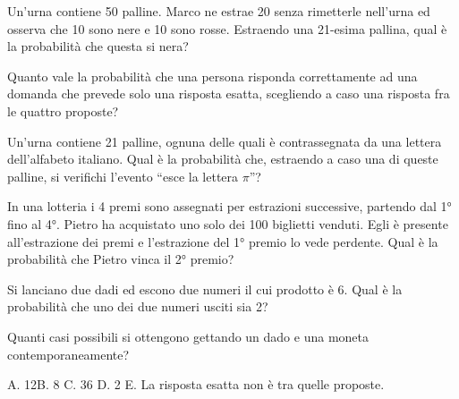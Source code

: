 \begin{esercizio} %
Un'urna contiene 50 palline. Marco ne estrae 20 senza rimetterle nell'urna ed 
osserva che 10 sono nere e 10 sono rosse. Estraendo una 21-esima pallina, qual è 
la probabilità che questa si nera?
\end{esercizio}

\begin{esercizio} %
Quanto vale la probabilità che una persona risponda correttamente ad una domanda 
che prevede solo una risposta esatta, scegliendo a caso una risposta fra le 
quattro proposte?
\end{esercizio}

\begin{esercizio} %
Un'urna contiene 21 palline, ognuna delle quali è contrassegnata da una lettera 
dell'alfabeto italiano. Qual è la probabilità che, estraendo a caso una di 
queste palline, si verifichi l'evento ``esce la lettera $ \pi $''?
\end{esercizio}

\begin{esercizio} %
In una lotteria i 4 premi sono assegnati per estrazioni successive, partendo dal 
1° fino al 4°. Pietro ha acquistato uno solo dei 100 biglietti venduti. Egli è 
presente all'estrazione dei premi e l'estrazione del 1° premio lo vede perdente. 
Qual è la probabilità che Pietro vinca il 2° premio?
\end{esercizio}

\begin{esercizio} %
Si lanciano due dadi ed escono due numeri il cui prodotto è 6. Qual è la 
probabilità che uno dei due numeri usciti sia 2?
\end{esercizio}

\begin{esercizio} %
Quanti casi possibili si ottengono gettando un dado e una moneta 
contemporaneamente?

A. 12\quad B. 8 \quad C. 36 \quad D. 2 \quad E. La risposta esatta non è tra 
quelle proposte.
\end{esercizio}

